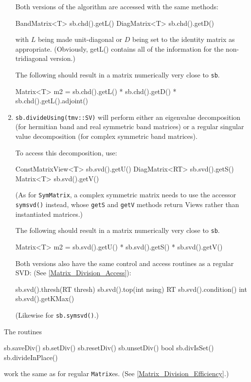 \documentclass[twoside,letterpaper,11pt]{article}
\renewcommand{\tt}[1]{{\lstinline {#1}}}
\begin{document}
\begin{enumerate}
Both versions of the algorithm are accessed with the same methods:
\begin{tmvcode}
BandMatrix<T> sb.chd().getL()
DiagMatrix<T> sb.chd().getD()
\end{tmvcode}
with $L$ being made unit-diagonal or $D$ being set to the identity matrix
as appropriate.  (Obviously, getL() contains all of the information for the non-tridiagonal
version.)

The following should result in a matrix numerically very close to \tt{sb}.
\begin{tmvcode}
Matrix<T> m2 = sb.chd().getL() * sb.chd().getD() * 
      sb.chd().getL().adjoint()
\end{tmvcode}

\item
\tt{sb.divideUsing(tmv::SV)} will perform either an eigenvalue decomposition
(for hermitian band and real symmetric band matrices) or a regular singular value
decomposition (for complex symmetric band matrices).

To access this decomposition, use:
\begin{tmvcode}
ConstMatrixView<T> sb.svd().getU()
DiagMatrix<RT> sb.svd().getS()
Matrix<T> sb.svd().getV()
\end{tmvcode}
(As for \tt{SymMatrix}, a complex symmetric matrix needs to use the accessor
\tt{symsvd()} instead, whose \tt{getS} and \tt{getV} methods return Views
rather than instantiated matrices.)

The following should result in a matrix numerically very close to \tt{sb}.
\begin{tmvcode}
Matrix<T> m2 = sb.svd().getU() * sb.svd().getS() * sb.svd().getV()
\end{tmvcode}

Both versions also have the same control and access routines as a regular SVD:
(See \ref{Matrix_Division_Access}):
\begin{tmvcode}
sb.svd().thresh(RT thresh)
sb.svd().top(int nsing)
RT sb.svd().condition()
int sb.svd().getKMax()
\end{tmvcode}
(Likewise for \tt{sb.symsvd()}.)

\end{enumerate}
The routines 
\begin{tmvcode}
sb.saveDiv()
sb.setDiv()
sb.resetDiv()
sb.unsetDiv()
bool sb.divIsSet()
sb.divideInPlace()
\end{tmvcode}
work the same as for regular \tt{Matrix}es.
(See \ref{Matrix_Division_Efficiency}.)
\end{document}

